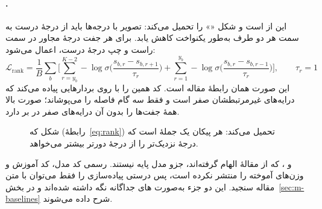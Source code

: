 \paragraph{.} این  از  است و شکل «» را تحمیل می‌کند:  تصویر با درجه‌ها باید از درجهٔ درست به سمت هر دو طرف به‌طور یکنواخت کاهش یابد. برای هر جفت درجهٔ مجاور در سمت راست و چپ درجهٔ درست،   اعمال می‌شود:
\begin{equation}
\mathcal{L}_{\mathrm{rank}} = \frac{1}{B} \sum_{b} \Bigg[ \sum_{r = y_b}^{K-2} -\log \sigma\!\Big(\frac{s_{b,r} - s_{b,r+1}}{\tau_r}\Big) + \sum_{r = 1}^{y_b} -\log \sigma\!\Big(\frac{s_{b,r} - s_{b,r-1}}{\tau_r}\Big) \Bigg], \qquad \tau_r = 1
\label{eq:rank}
\end{equation}
این صورت همان رابطهٔ مقاله است. کد  همین  را با  روی بردارهایی پیاده می‌کند که درایه‌های غیرمرتبطشان صفر است و فقط سه گام فاصله را می‌پوشاند؛ صورت بالا همهٔ جفت‌ها را بدون آن درایه‌های صفر در بر دارد.

\begin{figure}[H]
\centering
\begin{latin}
\end{latin}
\caption{شکل  که  (رابطهٔ~\ref{eq:rank}) تحمیل می‌کند: هر پیکان یک جملهٔ  است که  درجهٔ نزدیک‌تر را از درجهٔ دورتر بیشتر می‌خواهد.}
\label{fig:rank}
\end{figure}

\begin{notebox}
 و ، که از مقالهٔ  \cite{l2rclip} الهام گرفته‌اند، جزو مدل پایه نیستند.  رسمی  کد مدل، کد آموزش و وزن‌های آموخته را منتشر نکرده است، پس درستی پیاده‌سازی را فقط می‌توان با متن مقاله سنجید. این دو جزء به‌صورت های جداگانه نگه داشته شده‌اند و در بخش~\ref{sec:m-baselines} شرح داده می‌شوند.
\end{notebox}

